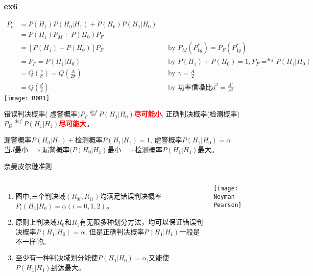 \begin{frame}[shrink]
\frametitle{ex6}
\begin{align*}
    P_e&=P(H_1)P(H_0|H_1)+P(H_0)P(H_1|H_0)\\
    &=P(H_1)P_M+P(H_0)P_F\\
    &=[P(H_1)+P(H_0)]P_F &&\text{by }P_M(P_{1g}^\ast)=P_F(P_{1g}^\ast)\\
    &=P_F=P(H_1|H_0) &&\text{by }P(H_1)+P(H_0)=1, P_F\mathop{=}^{def}P(H_1|H_0)\\
    &=Q(\frac{\gamma}{\sigma})=Q\left(\frac{A}{2\sigma}\right) && \text{by }\gamma=\frac{A}{2}\\
    &=Q(\frac{d}{2}) &&\text{by 功率信噪比}d^2=\frac{A^2}{\sigma^2}
\end{align*}
\texttt{[image: R0R1]}
\end{frame}

\begin{frame}
错误判决概率( 虚警概率)$P_F\mathop{=}\limits^{def}P(H_1|H_0)$\textcolor{red}{\textbf{尽可能小}}, 正确判决概率(检测概率)$P_D\mathop{=}\limits^{def}P(H_1|H_1)$\textcolor{red}{\textbf{尽可能大}}。

\medskip 
漏警概率$P(H_0|H_1)+$检测概率$P(H_1|H_1)=1$, 虚警概率$P(H_1|H_0)=\alpha$\\
当$J$最小$\implies$漏警概率$(P(H_0|H_1)$最小$\implies$检测概率$P(H_1|H_1)$最大。

\end{frame}

\begin{frame}{奈曼皮尔逊准则}
\begin{columns}
	\begin{enumerate}
		\item 图中,三个判决域$(R_{0i},R_{1i})$均满足错误判决概率$P_i(H_1|H_0)=\alpha(i=0,1,2)$。
		\item 原则上判决域$R_0$和$R_1$有无限多种划分方法，均可以保证错误判决概率$P(H_1|H_0)=\alpha$, 但是正确判决概率$P(H_1|H_1)$一般是不一样的。
		\item 至少有一种判决域划分能使$P(H_1|H_0)=\alpha$,又能使$P(H_1|H_1)$到达最大。
	\end{enumerate}
	\texttt{[image: Neyman-Pearson]}
\end{columns}
\end{frame}


